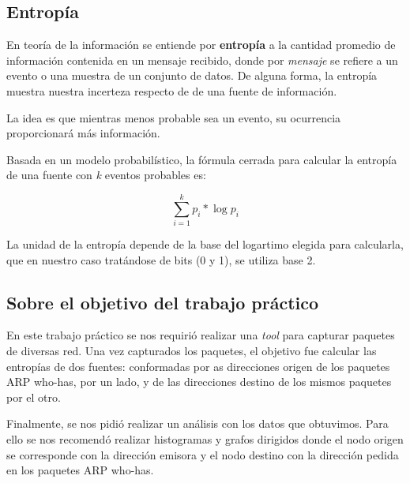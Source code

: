\subsection{Entropía}

En teoría de la información se entiende por \textbf{entropía} a la cantidad promedio de información contenida en un mensaje recibido, donde por \textit{mensaje} se refiere a un evento o una muestra de un conjunto de datos. De alguna forma, la entropía muestra nuestra incerteza respecto de de una fuente de información.\newline

La idea es que mientras menos probable sea un evento, su ocurrencia proporcionará más información.\newline

Basada en un modelo probabilístico, la fórmula cerrada para calcular la entropía de una fuente con \textit{k} eventos probables es:

$$\sum \limits_{i=1}^k p_i * \log{p_i}$$\newline

La unidad de la entropía depende de la base del logartimo elegida para calcularla, que en nuestro caso tratándose de bits (0 y 1), se utiliza base 2.\newline

\subsection{Sobre el objetivo del trabajo práctico}

En este trabajo práctico se nos requirió realizar una \textit{tool} para capturar paquetes de diversas red. Una vez capturados los paquetes, el objetivo fue calcular las entropías de dos fuentes: conformadas por as direcciones origen de los paquetes ARP who-has, por un lado, y de las direcciones destino de los mismos paquetes por el otro.\newline

Finalmente, se nos pidió realizar un análisis con los datos que obtuvimos. Para ello se nos recomendó realizar histogramas y grafos dirigidos donde el nodo origen se corresponde con la dirección emisora y el nodo destino con la dirección pedida en los paquetes ARP who-has.